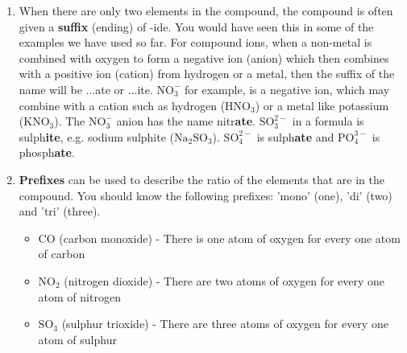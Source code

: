 \begin{enumerate}[noitemsep, label=\textbf{\arabic*}. ]
\begin{table}[H]
\begin{center}
\begin{xtabular}[t]{|l|l|}
        Permanganate &
        $\mathrm{MnO}_{4}^{-}$%
     \tabularnewline{}
    \end{xtabular}
      \end{center}
    \begin{center}{\small\bfseries Table 1.2}\end{center}
    \begin{caption}{\small\bfseries Table 1.2}\end{caption}
\end{table}
    \par
  \label{m38708*uid42}\item When there are only two elements in the compound, the compound is often given a \textbf{suffix} (ending) of -ide. You would have seen this in some of the examples we have used so far. For compound ions, when a non-metal is combined with oxygen to form a negative ion (anion) which then combines with a positive ion (cation) from hydrogen or a metal, then the suffix of the name will be ...ate or ...ite. $\mathrm{NO}_{3}^{-}$ for example, is a negative ion, which may combine with a cation such as hydrogen ($\mathrm{HNO}{}_{3}$) or a metal like potassium (KNO$_\text{3}$). The $\mathrm{NO}_{3}^{-}$ anion has the name nitr\textbf{ate}. $\mathrm{SO}_{3}^{2-}$ in a formula is sulph\textbf{ite}, e.g. sodium sulphite ($\mathrm{Na}{}_{2}\mathrm{SO}{}_{3}$).\newline
     $\mathrm{SO}_{4}^{2-}$ is sulph\textbf{ate} and $\mathrm{PO}_{4}^{3-}$ is phosph\textbf{ate}.
\label{m38708*uid43}\item \textbf{Prefixes} can be used to describe the ratio of the elements that are in the compound. You should know the following prefixes: 'mono' (one), 'di' (two) and 'tri' (three).
\label{m38708*id64977}\begin{itemize}[noitemsep]
            \label{m38708*uid44}\item $\mathrm{CO}$ (carbon monoxide) - There is one atom of oxygen for every one atom of carbon
\label{m38708*uid45}\item $\mathrm{NO}{}_{2}$ (nitrogen dioxide) - There are two atoms of oxygen for every one atom of nitrogen
\label{m38708*uid46}\item $\mathrm{SO}{}_{3}$ (sulphur trioxide) - There are three atoms of oxygen for every one atom of sulphur
\end{itemize}
        \end{enumerate}
